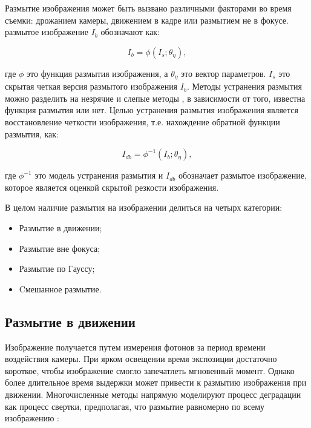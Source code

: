 

Размытие изображения может быть вызвано различными факторами во время съемки: дрожанием камеры, движением в кадре или размытием не в фокусе. размытое изображение \(I_{b}\) обозначают как:

\begin{equation}
	I_{b} = \phi(I_{s}; \theta_{\eta}),
\end{equation}


где \(\phi\) это функция размытия изображения, а \(\theta_{\eta}\) это вектор параметров. \(I_{s}\) это скрытая четкая версия размытого изображения \(I_{b}\). Методы устранения размытия можно разделить на незрячие и слепые методы \cite{zhang2022deep}, в зависимости от того, известна функция размытия или нет. Целью устранения размытия изображения является восстановление четкости изображения, т.е. нахождение обратной функции размытия, как:

\begin{equation}
	I_{db} = \phi^{-1}(I_{b}; \theta_{\eta}),
\end{equation}


где \(\phi^{-1}\) это модель устранения размытия и \(I_{db}\) обозначает размытое изображение, которое является оценкой скрытой резкости изображения.

В целом наличие размытия на изображении делиться на четырх категории:

\begin{itemize}
	\item Размытие в движении;
	\item Размытие вне фокуса;
	\item Размытие по Гауссу;
	\item Cмешанное размытие.
\end{itemize}

\subsection{Размытие в движении}

Изображение получается путем измерения фотонов за период времени воздействия камеры. При ярком освещении время экспозиции достаточно короткое, чтобы изображение смогло запечатлеть мгновенный момент. Однако более длительное время выдержки может привести к размытию изображения при движении. Многочисленные методы напрямую моделируют процесс деградации как процесс свертки, предполагая, что размытие равномерно по всему изображению \cite{gao2019dynamic}:

